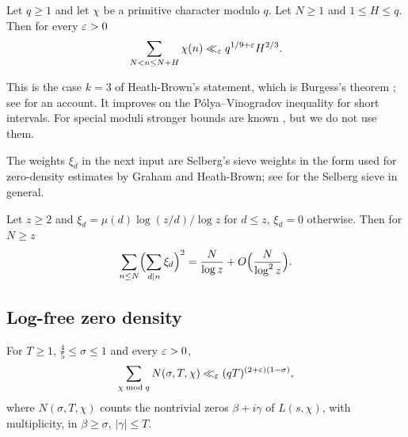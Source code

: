 \begin{inp}[Burgess {\cite[Lemma~2.1]{HeathBrown1992zero}, $k=3$}]\label{inp:burgess}
Let $q\ge1$ and let $\chi$ be a primitive character modulo $q$. Let $N\ge1$ and $1\le H\le q$. Then
for every $\varepsilon>0$
\[
  \sum_{N<n\le N+H}\chi(n)\ll_\varepsilon q^{1/9+\varepsilon}H^{2/3}.
\]
\end{inp}

This is the case $k=3$ of Heath-Brown's statement, which is Burgess's theorem
\cite{Burgess1962primitive,Burgess1962character,Burgess1963character,Burgess1986character}; see
\cite{HeathBrown2013burgess} for an account. It improves on the P\'olya--Vinogradov inequality
\cite{Polya1918verteilung,Vinogradov1918distribution} for short intervals. For special moduli stronger
bounds are known \cite{BarbanLinnikChudakov1964prime,Chang2014short,BanksShparlinski2019bounds,
Kerr2019moments,PetrowYoung2020weyl}, but we do not use them.

The weights $\xi_d$ in the next input are Selberg's sieve weights
\cite{Selberg1947elementary,Selberg1991lectures} in the form used for zero-density estimates by Graham
and Heath-Brown; see \cite{HalberstamRichert1974sieve,Motohashi1983lectures,FriedlanderIwaniec2010opera}
for the Selberg sieve in general.

\begin{inp}\label{inp:graham}
Let $z\ge2$ and $\xi_d=\mu(d)\log(z/d)/\log z$ for $d\le z$, $\xi_d=0$ otherwise. Then for $N\ge z$
\[
  \sum_{n\le N}\Bigl(\sum_{d\mid n}\xi_d\Bigr)^2=\frac N{\log z}+O\Bigl(\frac N{\log^2z}\Bigr).
\]
\end{inp}

\subsection{Log-free zero density}

\begin{inp}\label{inp:logfree}
For $T\ge1$, $\frac45\le\sigma\le1$ and every $\varepsilon>0$,
\[
  \sum_{\chi\bmod q}N(\sigma,T,\chi)\ll_\varepsilon(qT)^{(2+\varepsilon)(1-\sigma)},
\]
where $N(\sigma,T,\chi)$ counts the nontrivial zeros $\beta+i\gamma$ of $L(s,\chi)$, with multiplicity, in
$\beta\ge\sigma$, $|\gamma|\le T$.
\end{inp}


